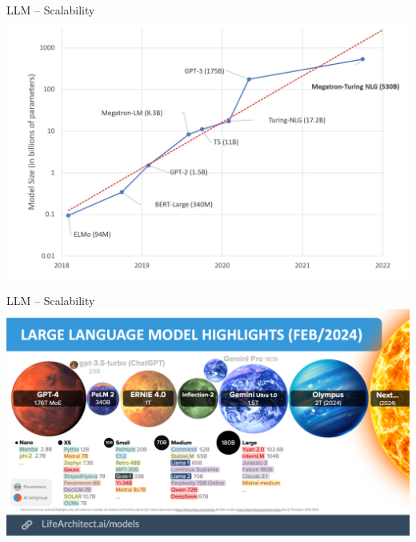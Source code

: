 \documentclass[presentation, 10pt]{beamer}\mode<presentation>{\usetheme{AMSBolognaFC}}
\begin{document}
\begin{frame}{LLM -- Scalability}
	\includegraphics[width=\textwidth]{img/over-year.jpg}
\end{frame}
\begin{frame}{LLM -- Scalability}
	\includegraphics[width=\textwidth]{img/image-size.png}
\end{frame}
\end{document}
